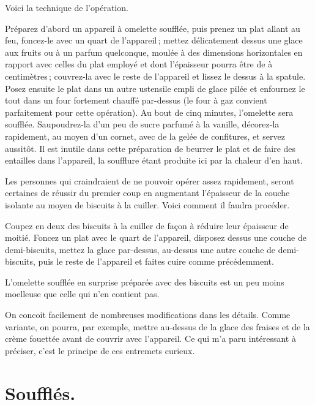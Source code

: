 \medskip

Voici la technique de l'opération.

Préparez d'abord un appareil à omelette soufflée, puis prenez un plat allant au
feu, foncez-le avec un quart de l'appareil ; mettez délicatement dessus une
glace aux fruits ou à un parfum quelconque, moulée à des dimensions
horizontales en rapport avec celles du plat employé et dont l'épaisseur pourra
être de {\mmm} à {\mmm} centimètres ; couvrez-la avec le reste de
l'appareil et lissez le dessus à la spatule. Posez ensuite le plat dans un
autre ustensile empli de glace pilée et enfournez le tout dans un four
fortement chauffé par-dessus (le four à gaz convient parfaitement pour cette
opération). Au bout de cinq minutes, l'omelette sera soufflée. Saupoudrez-la
d'un peu de sucre parfumé à la vanille, décorez-la rapidement, au moyen d'un
cornet, avec de la gelée de confitures, et servez aussitôt. Il est inutile dans
cette préparation de beurrer le plat et de faire des entailles dans l'appareil,
la soufflure étant produite ici par la chaleur d'en haut.

Les personnes qui craindraient de ne pouvoir opérer assez rapidement,
seront certaines de réussir du premier coup en augmentant l'épaisseur de
la couche isolante au moyen de biscuits à la cuiller. Voici comment il faudra
procéder.

Coupez en deux des biscuits à la cuiller de façon à réduire leur épaisseur de
moitié. Foncez un plat avec le quart de l'appareil, disposez dessus une couche
de demi-biscuits, mettez la glace par-dessus, au-dessus une autre couche de
demi-biscuits, puis le reste de l'appareil et faites cuire comme précédemment.

L'omelette soufflée en surprise préparée avec des biscuits est un peu moins
moelleuse que celle qui n'en contient pas.

\sk

On concoit facilement de nombreuses modifications dans les détails. Comme
variante, on pourra, par exemple, mettre au-dessus de la glace des fraises et de
la crème fouettée avant de couvrir avec l'appareil. Ce qui m'a paru intéressant
à préciser, c'est le principe de ces entremets curieux.

\section*{\centering Soufflés.}
{}

